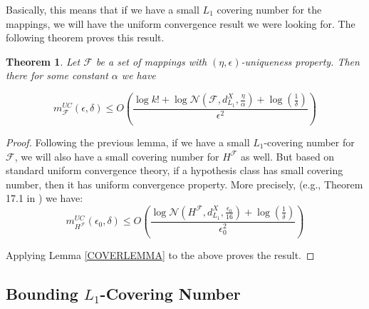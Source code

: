 \documentclass[letterpaper,12pt,titlepage,oneside,final]{book}
\newtheorem{theorem}{Theorem}
\newtheorem{corollary}{Corollary}
\begin{document}
Basically, this means that if we have a small $L_1$ covering number for the mappings, we will have the uniform convergence result we were looking for. The following theorem proves this result.

\begin{theorem} Let $\mathcal{F}$ be a set of mappings with $(\eta, \epsilon)$-uniqueness property. Then there for some constant $\alpha$ we have

\begin{equation}
m^{UC}_{\mathcal{F}}(\epsilon, \delta) \leq O(\frac{ \log k! + \log \mathcal{N}(\mathcal{F}, d_{L_1}^{X}, \frac{\eta}{\alpha})+\log(\frac{1}{\delta})}{\epsilon^2})
\end{equation}

\end{theorem}

\begin{proof}
Following the previous lemma, if we have a small $L_1$-covering number for $\mathcal{F}$, we will also have a small covering number for $H^{\mathcal{F}}$ as well. But based on standard uniform convergence theory, if a hypothesis class has small covering number, then it has uniform convergence property. More precisely, (e.g., Theorem 17.1 in \cite{anthony2009neural}) we have:
\begin{equation}
m^{UC}_{H^{\mathcal{F}}}(\epsilon_0, \delta) \leq O(\frac{ \log \mathcal{N}(H^{\mathcal{F}}, d_{L_1}^{X}, \frac{\epsilon_0}{16}) +\log(\frac{1}{\delta})}{\epsilon_0^2})
\end{equation}


Applying Lemma \ref{COVERLEMMA} to the above proves the result.
\end{proof}

%
%





\subsection{Bounding $L_1$-Covering Number }
\end{document}
